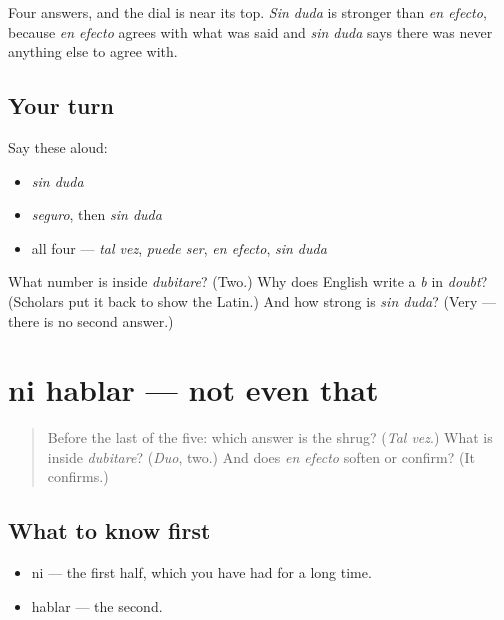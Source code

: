 \begin{grammarlens}[title={What you've built}]
Four answers, and the dial is near its top. \emph{Sin duda} is stronger than \emph{en efecto}, because \emph{en efecto} agrees with what was said and \emph{sin duda} says there was never anything else to agree with.
\end{grammarlens}

\subsection*{Your turn}
Say these aloud:

\begin{itemize}
\raggedright
  \item \emph{sin duda}
  \item \emph{seguro}, then \emph{sin duda}
  \item all four — \emph{tal vez}, \emph{puede ser}, \emph{en efecto}, \emph{sin duda}
\end{itemize}

\begin{tcolorbox}[breakable,colback=teal!4,colframe=teal!35!black,title={Before you move on}]
What number is inside \emph{dubitare}? (Two.) Why does English write a \emph{b} in \emph{doubt}? (Scholars put it back to show the Latin.) And how strong is \emph{sin duda}? (Very — there is no second answer.)
\end{tcolorbox}
\section[ni hablar]{ni hablar — not even that}

\label{lesson:ES-C298-ni-hablar}



\begin{quote}
Before the last of the five: which answer is the shrug? (\emph{Tal vez}.) What is inside \emph{dubitare}? (\emph{Duo}, two.) And does \emph{en efecto} soften or confirm? (It confirms.)
\end{quote}

\subsection*{What to know first}
\begin{itemize}
\raggedright
  \item ni — the first half, which you have had for a long time.
  \item hablar — the second.
\end{itemize}

